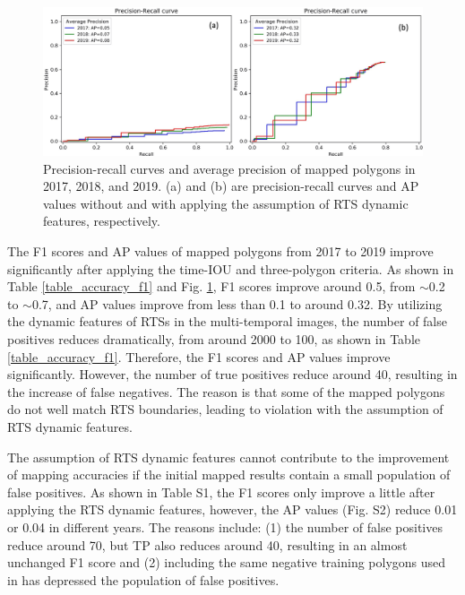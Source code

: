 \documentclass[authoryear,preprint,review,12pt]{elsarticle}
\begin{document}
\begin{figure} 
	\centering
	\includegraphics[width=14cm]{figs/exp7_p_r_curves_trim.jpg}
	\caption{Precision-recall curves and average precision of mapped polygons in 2017, 2018, and 2019. (a) and (b) are precision-recall curves and AP values without and with applying the assumption of RTS dynamic features, respectively.}
	\label{fig_p_r_curve_exp7}
\end{figure}


The F1 scores and AP values of mapped polygons from 2017 to 2019 improve significantly after applying the time-IOU and three-polygon criteria. 
As shown in Table \ref{table_accuracy_f1} and Fig. \ref{fig_p_r_curve_exp7}, F1 scores improve around 0.5, from $\sim$0.2 to $\sim$0.7, and AP values improve from less than 0.1 to around 0.32. 
By utilizing the dynamic features of RTSs in the multi-temporal images, the number of false positives reduces dramatically, from around 2000 to 100, as shown in Table \ref{table_accuracy_f1}.
Therefore, the F1 scores and AP values improve significantly.
However, the number of true positives reduce around 40, resulting in the increase of false negatives. 
The reason is that some of the mapped polygons do not well match RTS boundaries, leading to violation with the assumption of RTS dynamic features. 
 
The assumption of RTS dynamic features cannot contribute to the improvement of mapping accuracies if the initial mapped results contain a small population of false positives. 
As shown in Table S1, the F1 scores only improve a little after applying the RTS dynamic features, however, the AP values (Fig. S2) reduce 0.01 or 0.04 in different years.   
The reasons include: (1) the number of false positives reduce around 70, but TP also reduces around 40, resulting in an almost unchanged F1 score 
and (2) including the same negative training polygons used in \cite{huang2020using} has depressed the population of false positives. 
\end{document}

